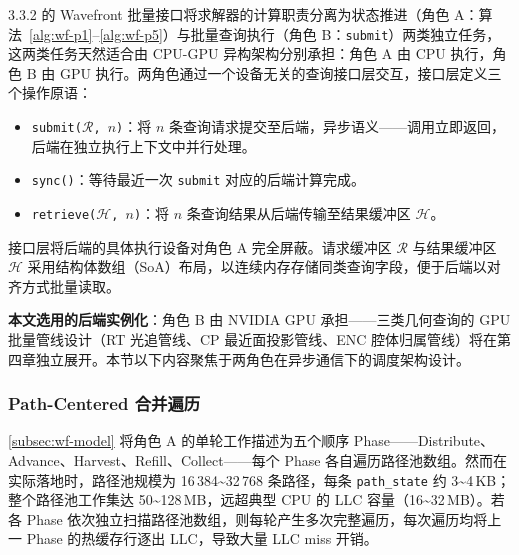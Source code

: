 3.3.2 的 Wavefront 批量接口将求解器的计算职责分离为状态推进（角色 A：算法~\ref{alg:wf-p1}--\ref{alg:wf-p5}）与批量查询执行（角色 B：\texttt{submit}）两类独立任务，这两类任务天然适合由 CPU-GPU 异构架构分别承担：角色 A 由 CPU 执行，角色 B 由 GPU 执行。两角色通过一个设备无关的查询接口层交互，接口层定义三个操作原语：
\begin{itemize}[nosep]
  \item \texttt{submit($\mathcal{R}$, $n$)}：将 $n$ 条查询请求提交至后端，异步语义——调用立即返回，后端在独立执行上下文中并行处理。
  \item \texttt{sync()}：等待最近一次 \texttt{submit} 对应的后端计算完成。
  \item \texttt{retrieve($\mathcal{H}$, $n$)}：将 $n$ 条查询结果从后端传输至结果缓冲区 $\mathcal{H}$。
\end{itemize}
接口层将后端的具体执行设备对角色 A 完全屏蔽。请求缓冲区 $\mathcal{R}$ 与结果缓冲区 $\mathcal{H}$ 采用结构体数组（SoA）布局，以连续内存存储同类查询字段，便于后端以对齐方式批量读取。

\textbf{本文选用的后端实例化}：角色 B 由 NVIDIA GPU 承担——三类几何查询的 GPU 批量管线设计（RT 光追管线、CP 最近面投影管线、ENC 腔体归属管线）将在第四章独立展开。本节以下内容聚焦于两角色在异步通信下的调度架构设计。

\subsubsection{Path-Centered 合并遍历}
\label{subsubsec:merge-pass}

\ref{subsec:wf-model} 将角色 A 的单轮工作描述为五个顺序 Phase——Distribute、Advance、Harvest、Refill、Collect——每个 Phase 各自遍历路径池数组。然而在实际落地时，路径池规模为 16\,384\textasciitilde 32\,768 条路径，每条 \texttt{path\_state} 约 3\textasciitilde 4\,KB；整个路径池工作集达 50\textasciitilde 128\,MB，远超典型 CPU 的 LLC 容量（16\textasciitilde 32\,MB）。若各 Phase 依次独立扫描路径池数组，则每轮产生多次完整遍历，每次遍历均将上一 Phase 的热缓存行逐出 LLC，导致大量 LLC miss 开销。

